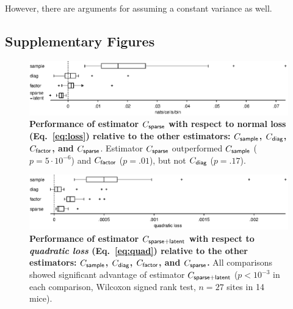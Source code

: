\documentclass[10pt]{article}
\begin{document}
However, there are arguments for assuming a constant variance as well.



\subsection*{Supplementary Figures}
\setcounter{figure}{0}
\renewcommand{\figurename}{Figure S}

\begin{figure}[!ht]
\begin{center}
\includegraphics{./figures/src/Supp1.eps}
\end{center}
\caption{
{\bf Performance of estimator $C_{\sf sparse}$ with respect to normal loss (Eq.~\ref{eq:loss}) relative to the other estimators: $C_{\sf sample}$, $C_{\sf diag}$, $C_{\sf factor}$, and $C_{\sf sparse}$}. 
Estimator $C_{\sf sparse}$ outperformed $C_{\sf sample}$ ($p=5\cdot 10^{-6}$) and $C_{\sf factor}$ ($p=.01$), but not $C_{\sf diag}$ ($p=.17$).}
\label{supp:01}
\end{figure}

\begin{figure}[!ht]
\begin{center}
\includegraphics{./figures/src/Supp2.eps}
\end{center}
\caption{
{\bf Performance of estimator $C_{\sf sparse+latent}$ with respect to \emph{quadratic loss} (Eq.~\ref{eq:quad}) relative to the other estimators: $C_{\sf sample}$, $C_{\sf diag}$, $C_{\sf factor}$, and $C_{\sf sparse}$.} 
All comparisons showed significant advantage of estimator $C_{\sf sparse+latent}$ ($p<10^{-3}$ in each comparison, Wilcoxon signed rank test, $n=27$ sites in 14 mice).}
\label{supp:02}
\end{figure}
\end{document}
